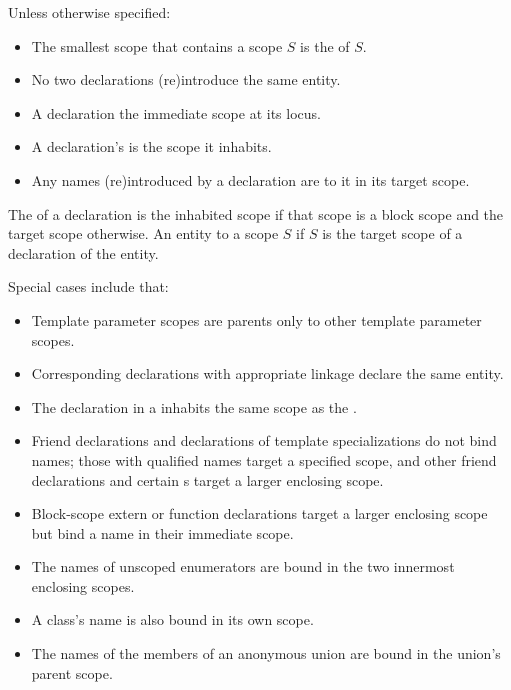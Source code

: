 \pnum
Unless otherwise specified:
\begin{itemize}
\item
The smallest scope that contains a scope $S$ is
the  of $S$.
\item
No two declarations (re)introduce the same entity.
\item
A declaration 
the immediate scope at its locus.
\item
A declaration's  is the scope it inhabits.
\item
Any names (re)introduced by a declaration are  to it
in its target scope.
\end{itemize}
The  of a declaration is
the inhabited scope if that scope is a block scope and
the target scope otherwise.
An entity  to a scope $S$
if $S$ is the target scope of a declaration of the entity.
\begin{note}
Special cases include that:
\begin{itemize}
\item
Template parameter scopes are parents
only to other template parameter scopes.
\item
Corresponding declarations with appropriate linkage
declare the same entity.
\item
The declaration in a 
inhabits the same scope as the .
\item
Friend declarations and
declarations of template specializations do not bind names;
those with qualified names target a specified scope, and
other friend declarations and
certain s
target a larger enclosing scope.
\item
Block-scope extern or function declarations target a larger enclosing scope
but bind a name in their immediate scope.
\item
The names of unscoped enumerators are bound
in the two innermost enclosing scopes.
\item
A class's name is also bound in its own scope.
\item
The names of the members of an anonymous union are bound in
the union's parent scope.
\end{itemize}
\end{note}

